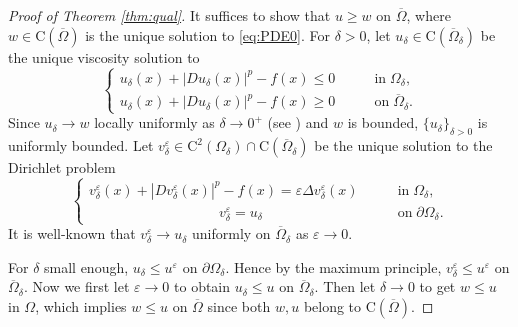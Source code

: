 \documentclass[12pt,reqno]{amsart}
\numberwithin{figure}{section}
\theoremstyle{plain}
\theoremstyle{remark}
\numberwithin{equation}{section}
\newcommand{\rmC}{\mathrm{C}}
\begin{document}
\begin{proof}[Proof of Theorem \ref{thm:qual}]
It suffices to show that $u\geq w$ on $\overline{\Omega}$, where $w\in \rmC(\overline{\Omega})$ is the unique solution to \eqref{eq:PDE0}. For $\delta>0$, let $u_\delta\in\rmC(\overline{\Omega}_\delta)$ be the  unique viscosity solution to
\begin{equation}\label{e:v_v}
    \begin{cases}
      u_\delta(x) + |Du_\delta(x)|^p-f(x) \leq 0 &\qquad\text{in}\;\Omega_\delta,\\
      u_\delta(x) + |Du_\delta(x)|^p - f(x) \geq 0 &\qquad\text{on}\;\overline{\Omega}_\delta.
    \end{cases}
\end{equation}
Since $u_\delta\rightarrow w$ locally uniformly as $\delta\rightarrow 0^+$ (see \cite{kim_state-constraint_2020}) and $w$ is bounded, $\{u_\delta\}_{\delta>0}$ is uniformly bounded. Let $v^\varepsilon_\delta\in \rmC^2(\Omega_\delta)\cap \rmC(\overline{\Omega}_\delta)$ be the unique solution to the Dirichlet problem
\begin{equation}\label{eq:vv_eps}
\begin{cases}
      v_\delta^\varepsilon(x) + |Dv_\delta^\varepsilon(x)|^p - f(x) = \varepsilon \Delta v_\delta^\varepsilon(x) &\qquad\text{in}\;\Omega_\delta,\\
    \;\quad\qquad\qquad\qquad\qquad v_\delta^\varepsilon = u_\delta &\qquad \text{on}\;\partial\Omega_\delta.
\end{cases}
\end{equation}
It is well-known that $v^\varepsilon_\delta\to u_\delta$ uniformly on $\overline{\Omega}_\delta$ as $\varepsilon\to 0$.

For $\delta$ small enough, $u_\delta\leq u^\varepsilon$ on $\partial \Omega_\delta$. Hence by the maximum principle, $v^\varepsilon_\delta \leq u^\varepsilon$ on $\overline{\Omega}_\delta$. Now we first let $\varepsilon\to 0$ to obtain $u_\delta \leq u$ on $\overline{\Omega}_\delta$.
Then let $\delta\rightarrow 0$ to get $w\leq u$ in $\Omega$, which implies $w\leq u$ on $\overline{\Omega}$ since both $w,u$ belong to $\rmC(\overline{\Omega})$.
\end{proof}
\end{document}
